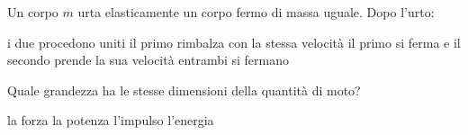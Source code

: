\documentclass[a4paper,10pt]{exam}
\begin{document}
\begin{questions}
\question Un corpo $m$ urta elasticamente un corpo fermo di massa uguale. Dopo l'urto:
\vspace{0.2em}
\begin{choices}
\choice i due procedono uniti
\choice il primo rimbalza con la stessa velocità
\choice il primo si ferma e il secondo prende la sua velocità
\choice entrambi si fermano
\end{choices}

\question Quale grandezza ha le stesse dimensioni della quantità di moto?
\vspace{0.2em}
\begin{choices}
\choice la forza
\choice la potenza
\choice l'impulso
\choice l'energia
\end{choices}

\end{questions}
\end{document}
